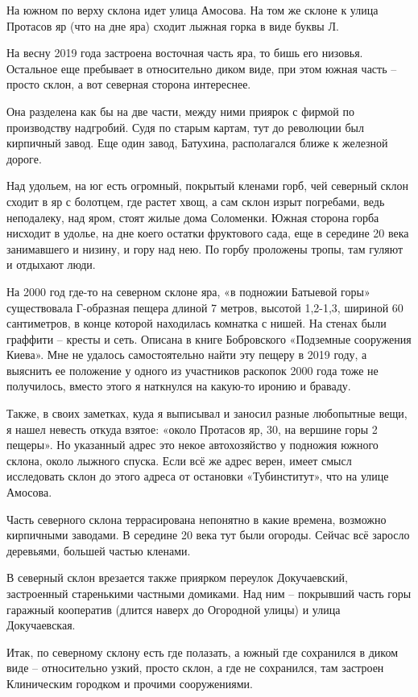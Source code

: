 На южном по верху склона идет улица Амосова. На том же склоне к улица Протасов яр (что на дне яра) сходит лыжная горка в виде буквы Л.

На весну 2019 года застроена восточная часть яра, то бишь его низовья. Остальное еще пребывает в относительно диком виде, при этом южная часть – просто склон, а вот северная сторона интереснее.

Она разделена как бы на две части, между ними приярок с фирмой по производству надгробий. Судя по старым картам, тут до революции был кирпичный завод. Еще один завод, Батухина, располагался ближе к железной дороге.

Над удольем, на юг есть огромный, покрытый кленами горб, чей северный склон сходит в яр с болотцем, где растет хвощ, а сам склон изрыт погребами, ведь неподалеку, над яром, стоят жилые дома Соломенки. Южная сторона горба нисходит в удолье, на дне коего остатки фруктового сада, еще в середине 20 века занимавшего и низину, и гору над нею. По горбу проложены тропы, там гуляют и отдыхают люди.

На 2000 год где-то на северном склоне яра, «в подножии Батыевой горы» существовала Г-образная пещера длиной 7 метров, высотой 1,2-1,3, шириной 60 сантиметров, в конце которой находилась комнатка с нишей. На стенах были граффити – кресты и сеть. Описана в книге Бобровского «Подземные сооружения Киева». Мне не удалось самостоятельно найти эту пещеру в 2019 году, а выяснить ее положение у одного из участников раскопок 2000 года тоже не получилось, вместо этого я наткнулся на какую-то иронию и браваду.

Также, в своих заметках, куда я выписывал и заносил разные любопытные вещи, я нашел невесть откуда взятое: «около Протасов яр, 30, на вершине горы 2 пещеры». Но указанный адрес это некое автохозяйство у подножия южного склона, около лыжного спуска. Если всё же адрес верен, имеет смысл исследовать склон до этого адреса от остановки «Тубинститут», что на улице Амосова.

Часть северного склона террасирована непонятно в какие времена, возможно кирпичными заводами. В середине 20 века тут были огороды. Сейчас всё заросло деревьями, большей частью кленами.

В северный склон врезается также приярком переулок Докучаевский, застроенный старенькими частными домиками. Над ним – покрывший часть горы гаражный кооператив (длится наверх до Огородной улицы) и улица Докучаевская.

Итак, по северному склону есть где полазать, а южный где сохранился в диком виде – относительно узкий, просто склон, а где не сохранился, там застроен Клиническим городком и прочими сооружениями.


